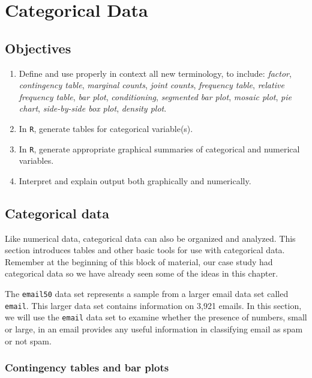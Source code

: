 \documentclass[
  letterpaper,
  DIV=11,
  numbers=noendperiod]{scrreprt}
\begin{document}

\chapter{Categorical Data}\label{CATDATA}

\section{Objectives}\label{objectives-6}

\begin{enumerate}
\def\labelenumi{\arabic{enumi})}
\item
  Define and use properly in context all new terminology, to include:
  \emph{factor}, \emph{contingency table}, \emph{marginal counts},
  \emph{joint counts}, \emph{frequency table}, \emph{relative frequency
  table}, \emph{bar plot}, \emph{conditioning}, \emph{segmented bar
  plot}, \emph{mosaic plot}, \emph{pie chart}, \emph{side-by-side box
  plot}, \emph{density plot}.
\item
  In \texttt{R}, generate tables for categorical variable(s).
\item
  In \texttt{R}, generate appropriate graphical summaries of categorical
  and numerical variables.
\item
  Interpret and explain output both graphically and numerically.
\end{enumerate}

\section{Categorical data}\label{categorical-data-1}

Like numerical data, categorical data can also be organized and
analyzed. This section introduces tables and other basic tools for use
with categorical data. Remember at the beginning of this block of
material, our case study had categorical data so we have already seen
some of the ideas in this chapter.

The \texttt{email50} data set represents a sample from a larger email
data set called \texttt{email}. This larger data set contains
information on 3,921 emails. In this section, we will use the
\texttt{email} data set to examine whether the presence of numbers,
small or large, in an email provides any useful information in
classifying email as spam or not spam.

\subsection{Contingency tables and bar
plots}\label{contingency-tables-and-bar-plots}
\end{document}
